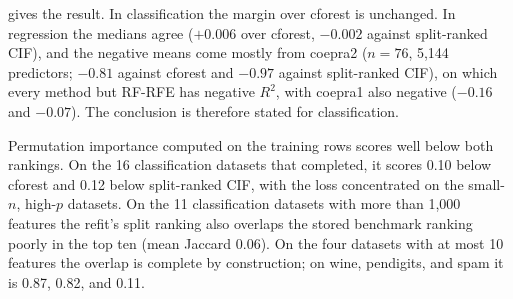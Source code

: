 gives the result. In classification the margin over
cforest is unchanged. In regression the medians agree ($+0.006$ over cforest, $-0.002$ against
split-ranked CIF), and the negative means come mostly from coepra2 ($n=76$, 5,144
predictors; $-0.81$ against cforest and $-0.97$ against split-ranked CIF), on
which every method but RF-RFE has negative $R^2$, with coepra1 also negative
($-0.16$ and $-0.07$). The
conclusion is therefore stated for classification.

Permutation importance computed on the training rows scores well below both
rankings. On the 16 classification datasets that completed, it scores 0.10 below cforest
and 0.12 below split-ranked CIF, with the loss concentrated on the small-$n$,
high-$p$ datasets. On the 11 classification datasets with more than 1,000
features the refit's split ranking also overlaps the stored benchmark ranking
poorly in the top ten (mean Jaccard 0.06). On the four datasets with at most 10
features the overlap is complete by construction; on wine, pendigits, and spam
it is 0.87, 0.82, and 0.11.

